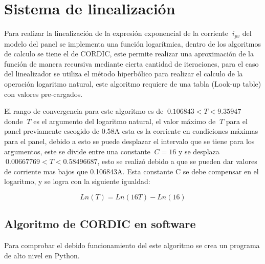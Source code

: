 \chapter{Sistema de linealización}
\label{ch:linealizacion}

Para realizar la linealización de la expresión exponencial de la corriente $\ i_{pv} $ del modelo del panel se implementa una función logarítmica, dentro de los algoritmos de calculo se tiene el de CORDIC, este permite realizar una aproximación de la función de manera recursiva mediante cierta cantidad de iteraciones, para el caso del linealizador se utiliza el método hiperbólico para realizar el calculo de la operación logaritmo natural, este algoritmo requiere de una tabla (Look-up table) con valores pre-cargados. 

El rango de convergencia para este algoritmo es de $\ 0.106843 < T < 9.35947 $ donde $\ T $ es el argumento del logaritmo natural, el valor máximo de $\ T $ para el panel previamente escogido de 0.58A esta es la corriente en condiciones máximas para el panel, debido a esto se puede desplazar el intervalo que se tiene para los argumentos, este se divide entre una constante $\ C = 16$ y se desplaza $\ 0.00667769 < T < 0.58496687 $, esto se realizó debido a que se pueden dar valores de corriente mas bajos que 0.106843A. Esta constante C se debe compensar en el logaritmo, y se logra con la siguiente igualdad: 

\begin{equation} \label{eq:ej1}
  Ln \left( T \right)
  = Ln \left( 16T \right) - Ln\left( 16 \right) 
\end{equation}  

  

\section{Algoritmo de CORDIC en software}
 
Para comprobar el debido funcionamiento del este algoritmo se crea un programa de alto nivel en Python.  


